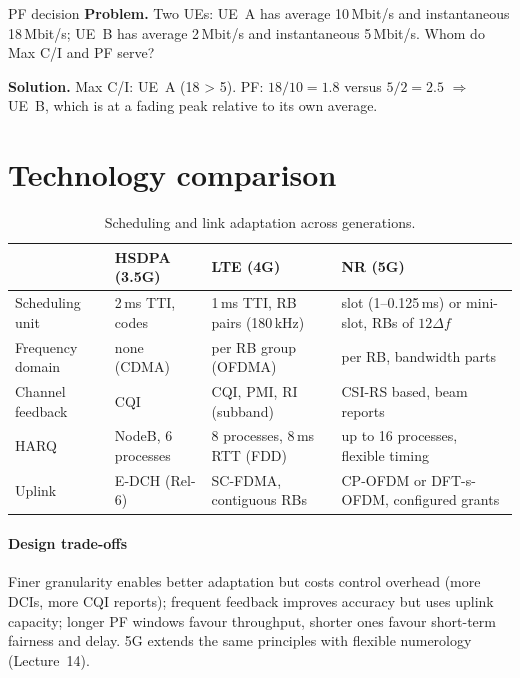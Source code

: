 \documentclass[11pt,a4paper]{article}
\begin{document}
\begin{examplebox}{PF decision}\label{ex:pf}
\textbf{Problem.} Two UEs: UE~A has average 10\,Mbit/s and instantaneous 18\,Mbit/s; UE~B has average
2\,Mbit/s and instantaneous 5\,Mbit/s. Whom do Max C/I and PF serve?

\textbf{Solution.} Max C/I: UE~A (18 > 5). PF: $18/10 = 1.8$ versus $5/2 = 2.5$ $\Rightarrow$ UE~B, which
is at a fading peak relative to its own average.
\end{examplebox}

\section{Technology comparison}
\begin{table}[htbp]
\centering\small
\caption{Scheduling and link adaptation across generations.}\label{tab:gens}
\begin{tabularx}{\linewidth}{@{}l Y Y Y@{}}
\toprule
{} & HSDPA (3.5G) & LTE (4G) & NR (5G) \\
\midrule
Scheduling unit   & 2\,ms TTI, codes            & 1\,ms TTI, RB pairs (180\,kHz)  & slot (1--0.125\,ms) or mini-slot, RBs of $12\Delta f$ \\
Frequency domain  & none (CDMA)                 & per RB group (OFDMA)            & per RB, bandwidth parts \\
Channel feedback  & CQI                         & CQI, PMI, RI (subband)          & CSI-RS based, beam reports \\
HARQ              & NodeB, 6 processes          & 8 processes, 8\,ms RTT (FDD)   & up to 16 processes, flexible timing \\
Uplink            & E-DCH (Rel-6)               & SC-FDMA, contiguous RBs         & CP-OFDM or DFT-s-OFDM, configured grants \\
\bottomrule
\end{tabularx}
\end{table}

\paragraph{Design trade-offs} Finer granularity enables better adaptation but costs control overhead
(more DCIs, more CQI reports); frequent feedback improves accuracy but uses uplink capacity; longer PF
windows favour throughput, shorter ones favour short-term fairness and delay. 5G extends the same
principles with flexible numerology (Lecture~14).
\end{document}

